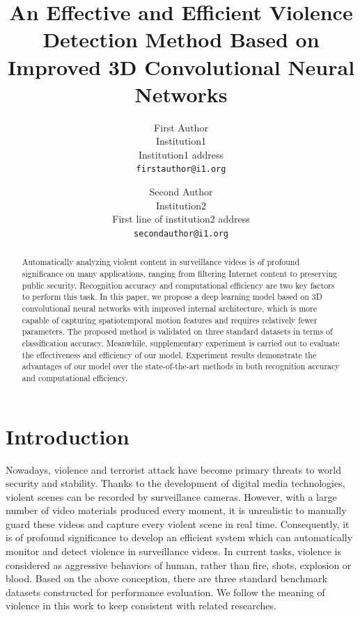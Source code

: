 \documentclass[10pt,twocolumn,letterpaper]{article}
\begin{document}
\title{An Effective and Efficient Violence Detection Method Based on Improved 3D Convolutional Neural Networks}

\author{First Author\\
Institution1\\
Institution1 address\\
{\tt\small firstauthor@i1.org}
\and
Second Author\\
Institution2\\
First line of institution2 address\\
{\tt\small secondauthor@i1.org}
}

\maketitle

\begin{abstract}
Automatically analyzing violent content in surveillance videos is of profound significance on many applications, ranging from filtering Internet content to preserving public security. Recognition accuracy and computational efficiency are two key factors to perform this task. In this paper, we propose a deep learning model based on 3D convolutional neural networks with improved internal architecture, which is more capable of capturing spatiotemporal motion features and requires relatively fewer parameters. The proposed method is validated on three standard datasets in terms of classification accuracy. Meanwhile, supplementary experiment is carried out to evaluate the effectiveness and efficiency of our model. Experiment results demonstrate the advantages of our model over the state-of-the-art methods in both recognition accuracy and computational efficiency.
\end{abstract}

\section{Introduction} \label{sec:1}

Nowadays, violence and terrorist attack have become primary threats to world security and stability.
Thanks to the development of digital media technologies, violent scenes can be recorded by surveillance cameras.
However, with a large number of video materials produced every moment, it is unrealistic to manually guard these videos and capture every violent scene in real time.
Consequently, it is of profound significance to develop an efficient system which can automatically monitor and detect violence in surveillance videos.
In current tasks, violence is considered as aggressive behaviors of human, rather than fire, shots, explosion or blood.
Based on the above conception, there are three standard benchmark datasets constructed for performance evaluation.
We follow the meaning of violence in this work to keep consistent with related researches.
\end{document}
